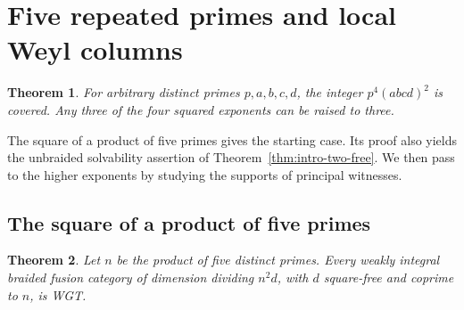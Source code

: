 \documentclass[11pt,a4paper]{article}
\numberwithin{equation}{section}
\newtheorem{theorem}{Theorem}[section]
\theoremstyle{remark}
\begin{document}
\section{Five repeated primes and local Weyl columns}\label{fam:W:sec:1}

\begin{theorem}\label{fam:W:1.1}\label{fam:W:n:thm:main}
For arbitrary distinct primes $p,a,b,c,d$,
the integer $p^4(abcd)^2$ is covered. Any three of the four squared
exponents can be raised to three.
\end{theorem}

The square of a product of five primes gives the starting case. Its proof also yields the unbraided solvability assertion of Theorem~\ref{thm:intro-two-free}. We then pass to the higher exponents by studying the supports of principal witnesses.
\subsection{The square of a product of five primes}\label{fam:M:sec:10.2}\label{seq:five-section}
\begin{theorem}\label{fam:M:10.4}\label{seq:five-squares}
Let $n$ be the product of five distinct primes. Every weakly integral
braided fusion category of dimension dividing $n^2d$, with $d$ square-free
and coprime to $n$, is WGT.
\end{theorem}
\end{document}
